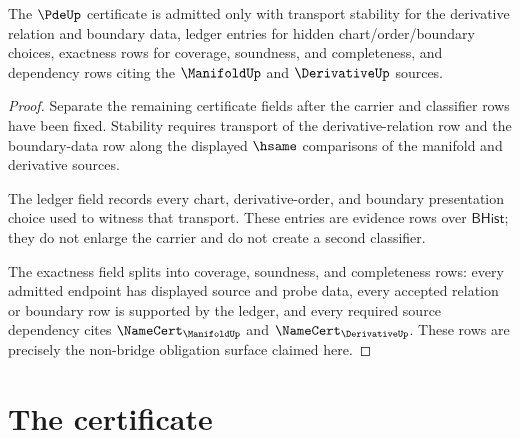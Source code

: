\begin{theorem}
\label{thm:pde-stability-ledger-exactness-obligation}
The $\PdeUp$ certificate is admitted only with transport stability for the
derivative relation and boundary data, ledger entries for hidden
chart/order/boundary choices, exactness rows for coverage, soundness, and
completeness, and dependency rows citing the $\ManifoldUp$ and
$\DerivativeUp$ sources.
\end{theorem}
\begin{proof}
Separate the remaining certificate fields after the carrier and classifier
rows have been fixed. Stability requires transport of the derivative-relation
row and the boundary-data row along the displayed $\hsame$ comparisons of the
manifold and derivative sources.

The ledger field records every chart, derivative-order, and boundary
presentation choice used to witness that transport. These entries are
evidence rows over $\mathsf{BHist}$; they do not enlarge the carrier and do
not create a second classifier.

The exactness field splits into coverage, soundness, and completeness rows:
every admitted endpoint has displayed source and probe data, every accepted
relation or boundary row is supported by the ledger, and every required
source dependency cites $\NameCert_{\ManifoldUp}$ and
$\NameCert_{\DerivativeUp}$. These rows are precisely the non-bridge
obligation surface claimed here.
\end{proof}

\section{The certificate}
\label{sec:pde-certificate}

